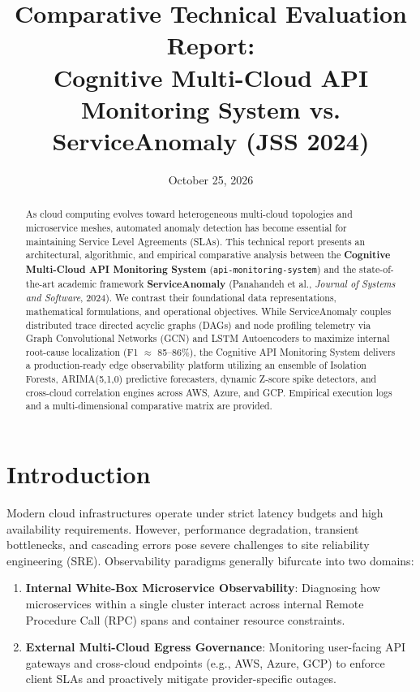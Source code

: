 \documentclass[11pt,a4paper]{article}
\title{\textbf{\Large Comparative Technical Evaluation Report:}\\[0.3em]
\textbf{\large Cognitive Multi-Cloud API Monitoring System vs. ServiceAnomaly (JSS 2024)}}
\author{}
\date{October 25, 2026}
\begin{document}
\maketitle

\begin{abstract}
As cloud computing evolves toward heterogeneous multi-cloud topologies and microservice meshes, automated anomaly detection has become essential for maintaining Service Level Agreements (SLAs). This technical report presents an architectural, algorithmic, and empirical comparative analysis between the \textbf{Cognitive Multi-Cloud API Monitoring System} (\texttt{api-monitoring-system}) and the state-of-the-art academic framework \textbf{ServiceAnomaly} (Panahandeh et al., \textit{Journal of Systems and Software}, 2024). We contrast their foundational data representations, mathematical formulations, and operational objectives. While ServiceAnomaly couples distributed trace directed acyclic graphs (DAGs) and node profiling telemetry via Graph Convolutional Networks (GCN) and LSTM Autoencoders to maximize internal root-cause localization (F1 $\approx$ 85--86\%), the Cognitive API Monitoring System delivers a production-ready edge observability platform utilizing an ensemble of Isolation Forests, ARIMA(5,1,0) predictive forecasters, dynamic Z-score spike detectors, and cross-cloud correlation engines across AWS, Azure, and GCP. Empirical execution logs and a multi-dimensional comparative matrix are provided.
\end{abstract}

\section{Introduction}
Modern cloud infrastructures operate under strict latency budgets and high availability requirements. However, performance degradation, transient bottlenecks, and cascading errors pose severe challenges to site reliability engineering (SRE). Observability paradigms generally bifurcate into two domains:
\begin{enumerate}[leftmargin=*]
    \item \textbf{Internal White-Box Microservice Observability}: Diagnosing how microservices within a single cluster interact across internal Remote Procedure Call (RPC) spans and container resource constraints.
    \item \textbf{External Multi-Cloud Egress Governance}: Monitoring user-facing API gateways and cross-cloud endpoints (e.g., AWS, Azure, GCP) to enforce client SLAs and proactively mitigate provider-specific outages.
\end{enumerate}
\end{document}
